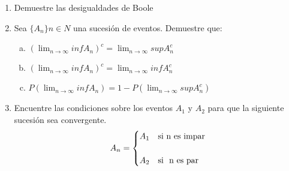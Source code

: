 \documentclass[12pt]{article}
\begin{document}
\begin{enumerate}
\item Demuestre las desigualdades de Boole\\[0.2cm]


\item Sea $\{A_n\}n \in {N}$ una sucesión de eventos. Demuestre que:
\begin{enumerate}[a)]
\item $\left(\displaystyle\lim_{n\longrightarrow \infty}{inf}A_n\right)^c =\displaystyle\lim_{n\longrightarrow \infty} {sup}{A_n^c} $
\item $\left(\displaystyle\lim_{n\longrightarrow \infty}{inf}A_n\right)^c =\displaystyle\lim_{n\longrightarrow \infty} {inf}{A_n^c} $
\item $P\left(\displaystyle\lim_{n\longrightarrow \infty}{inf}A_n\right) =1-P\left(\displaystyle\lim_{n\longrightarrow \infty}{sup}A_n^c\right)$ 
\end{enumerate}

\item Encuentre las condiciones sobre los eventos $A_1$ y $A_2$ para que la siguiente sucesión sea convergente.
\[A_n = \begin{cases} 
     A_1  & \mbox{si } $n es impar$   \\[0.5cm]
      A_2  & \mbox{si }$ n es par$
 \end{cases} \]

\end{enumerate}
\end{document}
